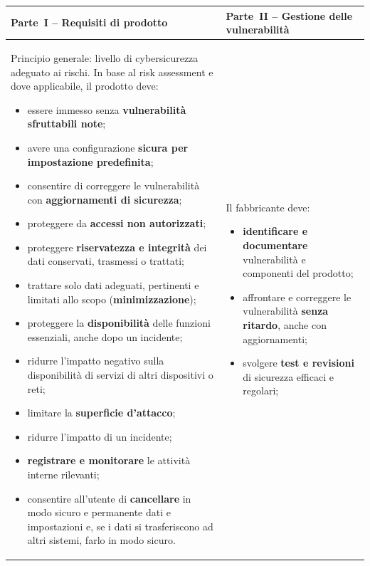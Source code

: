 \begin{center}
\small
\begin{tabularx}{\linewidth}{>{\raggedright\arraybackslash}X >{\raggedright\arraybackslash}X}
\toprule
\textbf{Parte~I -- Requisiti di prodotto} & \textbf{Parte~II -- Gestione delle vulnerabilità}\\
\midrule
Principio generale: livello di cybersicurezza adeguato ai rischi. In base al risk assessment e dove
applicabile, il prodotto deve:
\begin{itemize}[leftmargin=1.2em,nosep]
  \item essere immesso senza \textbf{vulnerabilità sfruttabili note};
  \item avere una configurazione \textbf{sicura per impostazione predefinita};
  \item consentire di correggere le vulnerabilità con \textbf{aggiornamenti di sicurezza};
  \item proteggere da \textbf{accessi non autorizzati};
  \item proteggere \textbf{riservatezza e integrità} dei dati conservati, trasmessi o trattati;
  \item trattare solo dati adeguati, pertinenti e limitati allo scopo (\textbf{minimizzazione});
  \item proteggere la \textbf{disponibilità} delle funzioni essenziali, anche dopo un incidente;
  \item ridurre l'impatto negativo sulla disponibilità di servizi di altri dispositivi o reti;
  \item limitare la \textbf{superficie d'attacco};
  \item ridurre l'impatto di un incidente;
  \item \textbf{registrare e monitorare} le attività interne rilevanti;
  \item consentire all'utente di \textbf{cancellare} in modo sicuro e permanente dati e impostazioni e,
    se i dati si trasferiscono ad altri sistemi, farlo in modo sicuro.
\end{itemize}
&
Il fabbricante deve:
\begin{itemize}[leftmargin=1.2em,nosep]
  \item \textbf{identificare e documentare} vulnerabilità e componenti del prodotto;
  \item affrontare e correggere le vulnerabilità \textbf{senza ritardo}, anche con aggiornamenti;
  \item svolgere \textbf{test e revisioni} di sicurezza efficaci e regolari;

\end{itemize}
\end{tabularx}
\end{center}

